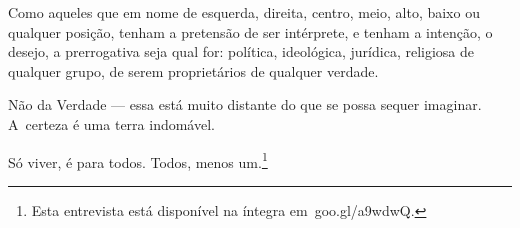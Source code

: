  

Como aqueles que em nome de esquerda, direita, centro, meio, alto, baixo
ou qualquer posição, tenham a pretensão de ser intérprete, e tenham a
intenção, o desejo, a prerrogativa seja qual for: política, ideológica,
jurídica, religiosa de qualquer grupo, de serem proprietários de
qualquer verdade.

Não da Verdade --- essa está muito distante do que se possa sequer
imaginar. A~certeza é uma terra indomável.

Só viver, é para todos. Todos, menos um.\footnote{Esta entrevista está disponível na íntegra em~goo.gl/a9wdwQ.} 

\fechafala 
